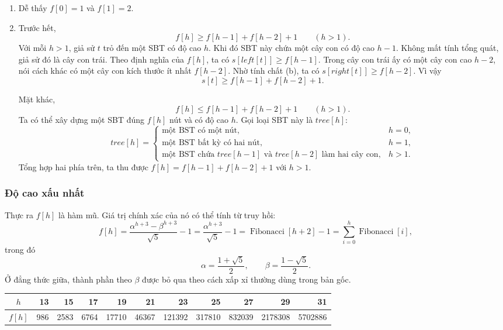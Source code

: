 \documentclass[11pt]{article}
\begin{document}
\begin{enumerate}
  \item Dễ thấy $f[0]=1$ và $f[1]=2$.
  \item Trước hết,
  \[
    f[h]\ge f[h-1]+f[h-2]+1 \qquad (h>1).
  \]
  Với mỗi $h>1$, giả sử $t$ trỏ đến một SBT có độ cao $h$. Khi đó SBT này
  chứa một cây con có độ cao $h-1$. Không mất tính tổng quát, giả sử đó là
  cây con trái. Theo định nghĩa của $f[h]$, ta có
  $s[\mathit{left}[t]]\ge f[h-1]$. Trong cây con trái ấy có một cây con cao
  $h-2$, nói cách khác có một cây con kích thước ít nhất $f[h-2]$. Nhờ tính
  chất (b), ta có $s[\mathit{right}[t]]\ge f[h-2]$. Vì vậy
  \[
    s[t]\ge f[h-1]+f[h-2]+1.
  \]

  Mặt khác,
  \[
    f[h]\le f[h-1]+f[h-2]+1 \qquad (h>1).
  \]
  Ta có thể xây dựng một SBT đúng $f[h]$ nút và có độ cao $h$. Gọi loại SBT
  này là $\mathit{tree}[h]$:
  \[
  \mathit{tree}[h]=
  \begin{cases}
  \text{một BST có một nút}, & h=0,\\
  \text{một BST bất kỳ có hai nút}, & h=1,\\
  \text{một BST chứa }\mathit{tree}[h-1]\text{ và }\mathit{tree}[h-2]
  \text{ làm hai cây con}, & h>1.
  \end{cases}
  \]
  Tổng hợp hai phía trên, ta thu được
  $f[h]=f[h-1]+f[h-2]+1$ với $h>1$.
\end{enumerate}

\subsubsection{Độ cao xấu nhất}

Thực ra $f[h]$ là hàm mũ. Giá trị chính xác của nó có thể tính từ truy hồi:
\[
f[h]
=\frac{\alpha^{h+3}-\beta^{h+3}}{\sqrt{5}}-1
=\frac{\alpha^{h+3}}{\sqrt{5}}-1
=\operatorname{Fibonacci}[h+2]-1
=\sum_{i=0}^{h}\operatorname{Fibonacci}[i],
\]
trong đó
\[
  \alpha=\frac{1+\sqrt{5}}{2},
  \qquad
  \beta=\frac{1-\sqrt{5}}{2}.
\]
Ở đẳng thức giữa, thành phần theo $\beta$ được bỏ qua theo cách xấp xỉ thường
dùng trong bản gốc.

\begin{center}
\begin{tabular}{c|rrrrrrrrrr}
$h$ & 13 & 15 & 17 & 19 & 21 & 23 & 25 & 27 & 29 & 31\\
\hline
$f[h]$ & 986 & 2583 & 6764 & 17710 & 46367 & 121392 & 317810 & 832039
& 2178308 & 5702886
\end{tabular}
\end{center}
\end{document}
